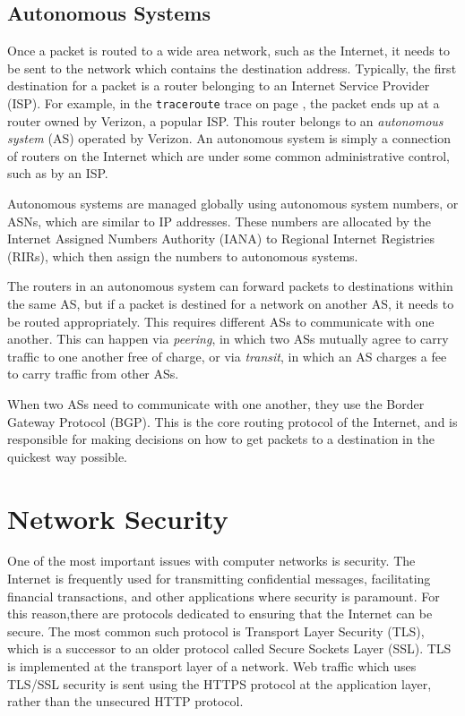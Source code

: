 \subsection{Autonomous Systems}

Once a packet is routed to a wide area network, such as the Internet, it needs to be sent to the network which contains the destination address. Typically, the first destination for a packet is a router belonging to an Internet Service Provider (ISP). For example, in the \texttt{traceroute} trace on page \pageref{code:traceroute}, the packet ends up at a router owned by Verizon, a popular ISP. This router belongs to an \emph{autonomous system} (AS) operated by Verizon. An autonomous system is simply a connection of routers on the Internet which are under some common administrative control, such as by an ISP.

Autonomous systems are managed globally using autonomous system numbers, or ASNs, which are similar to IP addresses. These numbers are allocated by the Internet Assigned Numbers Authority (IANA) to Regional Internet Registries (RIRs), which then assign the numbers to autonomous systems.

The routers in an autonomous system can forward packets to destinations within the same AS, but if a packet is destined for a network on another AS, it needs to be routed appropriately. This requires different ASs to communicate with one another. This can happen via \emph{peering}, in which two ASs mutually agree to carry traffic to one another free of charge, or via \emph{transit}, in which an AS charges a fee to carry traffic from other ASs.

When two ASs need to communicate with one another, they use the Border Gateway Protocol (BGP). This is the core routing protocol of the Internet, and is responsible for making decisions on how to get packets to a destination in the quickest way possible. 

\section{Network Security}\label{sec:network:security}

One of the most important issues with computer networks is security. The Internet is frequently used for transmitting confidential messages, facilitating financial transactions, and other applications where security is paramount. For this reason,there are protocols dedicated to ensuring that the Internet can be secure. The most common such protocol is Transport Layer Security (TLS), which is a successor to an older protocol called Secure Sockets Layer (SSL). TLS is implemented at the transport layer of a network. Web traffic which uses TLS/SSL security is sent using the HTTPS protocol at the application layer, rather than the unsecured HTTP protocol.

